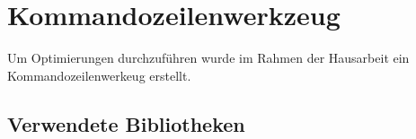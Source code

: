 \section{Kommandozeilenwerkzeug}
Um Optimierungen durchzuführen wurde im Rahmen der Hausarbeit ein Kommandozeilenwerkeug erstellt.

\subsection{Verwendete Bibliotheken}

